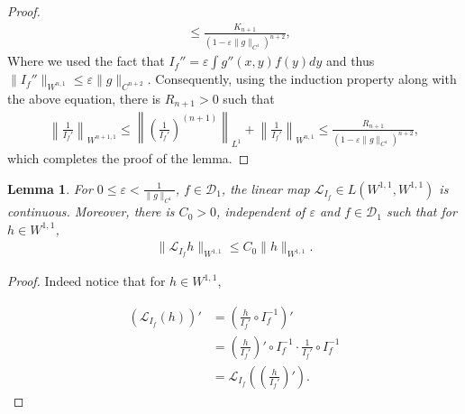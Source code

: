 \documentclass[12pt]{article}
\def\L{\mathcal{L}}
\newcommand{\eps}{\varepsilon}
\theoremstyle{plain}
\newtheorem{lemma}[theorem]{Lemma}
\begin{document}
{\begin{proof}
\begin{align*}
    &\leq \frac{K_{n+1}}{(1-\eps \|g\|_{C^1})^{n+2}},
\end{align*}
Where we used the fact that $I_f''=\eps\int g''(x,y)f(y)dy$ and thus $\|I_f''\|_{W^{n,1}} \leq \eps \|g\|_{C^{n+2}}$.
Consequently, using the induction property along with the above equation, there is $R_{n+1}>0$ such that 
\begin{align*}
    \left\|\frac{1}{I_f'}\right\|_{W^{n+1,1}}\leq \left\|\left(\frac{1}{I_f'}\right)^{(n+1)}\right\|_{L^1}+ \left\|\frac{1}{I_f'}\right\|_{W^{n,1}}\leq \frac{R_{n+1}}{(1-\eps \|g\|_{C^1})^{n+2}},
\end{align*}
which completes the proof of the lemma.
\end{proof}
\begin{lemma}\label{lem:LIfcon}
    For $0\le\eps< \frac{1}{\|g\|_{C^1}}$, $f\in \mathcal D_1$, the linear map $\L_{I_f}\in L(W^{1,1},W^{1,1})$ is continuous. Moreover, there is $C_0>0$, independent of $\eps$ and $f\in\mathcal D_1$ such that for $h\in W^{1,1}$,
\begin{align*}
    \|\L_{I_f}h\|_{W^{1,1}}\leq C_0\|h\|_{W^{1,1}}.
\end{align*}

\end{lemma}

\begin{proof}


    Indeed notice that for $h\in W^{1,1}$,
    
    \begin{align}
    \left(\L_{I_f}(h)\right)'&=\left(\frac{h}{I_f'}\circ I_f^{-1}\right)'\nonumber\\
    &=\left(\frac{h}{I_f'}\right)'\circ I_f^{-1}\cdot \frac{1}{I_f'}\circ I_f^{-1}\nonumber\\
    &=\L_{I_f}\left(\left(\frac{h}{I_f'}\right)'\right).\label{eq:Lifh}
\end{align}


\end{proof}}
\end{document}
